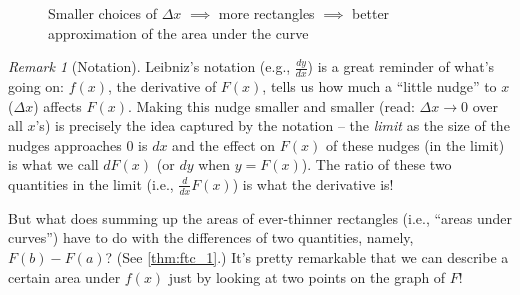 \documentclass[12pt,english]{scrartcl}
\theoremstyle{definition}
\theoremstyle{remark}
\newtheorem*{remark}{Remark}
\begin{document}
\begin{figure}[ht]
    \caption{Smaller choices of $\Delta x$ $\implies$ more rectangles $\implies$ better approximation of the area under the curve}
    \label{fig:riemann_sum}
\end{figure}

\begin{remark}[Notation] Leibniz's notation (e.g., $\frac{dy}{dx}$) is a great
    reminder of what's going on: $f(x)$, the derivative of $F(x)$, tells us how
    much a ``little nudge'' to $x$ ($\Delta x$) affects $F(x)$. Making this
    nudge smaller and smaller (read: $\Delta x \to 0$ over all $x$'s) is
    precisely the idea captured by the notation -- the \textit{limit} as the
    size of the nudges approaches $0$ is $dx$ and the effect on $F(x)$ of these
    nudges (in the limit) is what we call $dF(x)$ (or $dy$ when $y=F(x)$). The
    ratio of these two quantities in the limit (i.e., $\frac{d}{dx}F(x)$) is what
    the derivative is!
\end{remark}


But what does summing up the areas of ever-thinner rectangles (i.e., ``areas
under curves'') have to do with the differences of two quantities, namely,
$F(b)-F(a)$? (See \cref{thm:ftc_1}.) It's pretty remarkable that we can
describe a certain area under $f(x)$ just by looking at two points on the graph
of $F$!
\end{document}
